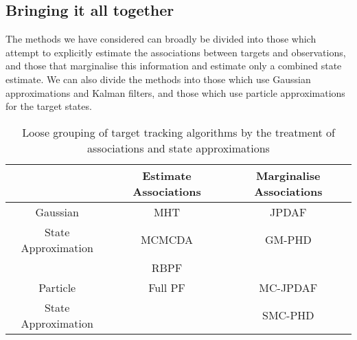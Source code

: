 \subsection{Bringing it all together}
The methods we have considered can broadly be divided into those which attempt to explicitly estimate the associations between targets and observations, and those that marginalise this information and estimate only a combined state estimate. We can also divide the methods into those which use Gaussian approximations and Kalman filters, and those which use particle approximations for the target states.

\begin{table}[!hbt]%
\begin{center}\begin{tabular}{|c|c|c|}
\hline
 & Estimate Associations & Marginalise Associations\\
\hline
Gaussian & MHT & JPDAF \\
State Approximation & MCMCDA & GM-PHD \\ 
 & RBPF & \\
\hline
Particle & Full PF & MC-JPDAF \\
State Approximation & & SMC-PHD \\
\hline
\end{tabular}\end{center}
\caption{Loose grouping of target tracking algorithms by the treatment of associations and state approximations}
\label{}
\end{table}
